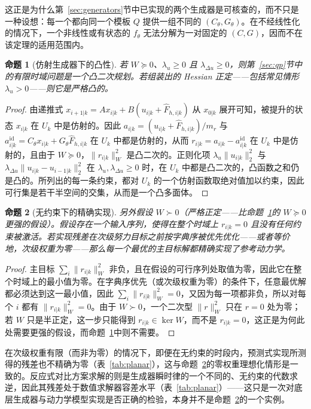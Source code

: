 \documentclass[journal]{IEEEtran}
\newtheorem{proposition}{命题}
\begin{document}
这正是为什么第~\ref{sec:generators}节中已实现的两个生成器是可核查的，而不只是一种设想：每一个都向同一个模板 $Q$ 提供一组不同的 $(C_\theta,G_\theta)$。在不经线性化的情况下，一个非线性或有状态的 $f_\theta$ 无法分解为一对固定的 $(C,G)$，因而不在该定理的适用范围内。

\begin{proposition}[仿射生成器下的凸性]
\label{prop:convexity}
若 $W\succeq0$、$\lambda_u\ge0$ 且 $\lambda_{\Delta u}\ge0$，则第~\ref{sec:qp}节中的有限时域问题是一个凸二次规划。若组装出的 Hessian 正定——包括常见情形 $\lambda_u>0$——则它是严格凸的。
\end{proposition}

\begin{proof}
由递推式 $x_{i+1|k}=Ax_{i|k}+B(u_{i|k}+\hat F_{h,i|k})$ 从 $x_{0|k}$ 展开可知，被提升的状态 $x_{i|k}$ 在 $U_k$ 中是仿射的。因此 $a_{i|k}=(u_{i|k}+\hat F_{h,i|k})/m_r$ 与 $a_{i|k}^{\mathrm{id}}=C_\theta x_{i|k}+G_\theta\hat F_{h,i|k}$ 在 $U_k$ 中都是仿射的，从而 $r_{i|k}=a_{i|k}-a_{i|k}^{\mathrm{id}}$ 在 $U_k$ 中是仿射的，且由于 $W\succeq0$，$\|r_{i|k}\|_W^2$ 是凸二次的。正则化项 $\lambda_u\|u_{i|k}\|_2^2$ 与 $\lambda_{\Delta u}\|u_{i|k}-u_{i-1|k}\|_2^2$ 在 $\lambda_u,\lambda_{\Delta u}\ge0$ 时，在 $U_k$ 中都是凸二次的，凸函数之和仍是凸的。所列出的每一条约束，都对 $U_k$ 的一个仿射函数取绝对值加以约束，因此可行集是若干半空间的交集，从而是一个凸多面体。
\end{proof}

\begin{proposition}[无约束下的精确实现]
\label{prop:exact}
另外假设 $W\succ0$（严格正定——比命题~\ref{prop:convexity}的 $W\succeq0$ 更强的假设）。假设存在一个输入序列，使得在整个时域上 $r_{i|k}=0$ 且没有任何约束被激活。若实现残差在次级努力目标之前按字典序被优先优化——或者等价地，次级权重为零——那么每一个最优的主目标解都精确实现了参考动力学。
\end{proposition}

\begin{proof}
主目标 $\sum_i\|r_{i|k}\|_W^2$ 非负，且在假设的可行序列处取值为零，因此它在整个时域上的最小值为零。在字典序优先（或次级权重为零）的条件下，任意最优解都必须达到这一最小值，因此 $\sum_i\|r_{i|k}\|_W^2=0$，又因为每一项都非负，所以对每个 $i$ 都有 $\|r_{i|k}\|_W^2=0$。由于 $W\succ0$，一个二次型 $\|r\|_W^2$ 只在 $r=0$ 处为零；若 $W$ 只是半正定，这一步只能得到 $r_{i|k}\in\ker W$，而不是 $r_{i|k}=0$，这正是为何此处需要更强的假设，而命题~\ref{prop:convexity}中则不需要。
\end{proof}

在次级权重有限（而非为零）的情况下，即便在无约束的时段内，预测式实现所测得的残差也不精确为零（表~\ref{tab:planar}），这与命题~\ref{prop:exact}的零权重理想化情形是一致的。反应式对比方案求解的则是生成器瞬时律的一个不同的、无约束的代数求逆，因此其残差处于数值求解器容差水平（表~\ref{tab:planar}）——这只是一次对底层生成器与动力学模型实现是否正确的检验，本身并不是命题~\ref{prop:exact}的一个实例。
\end{document}

